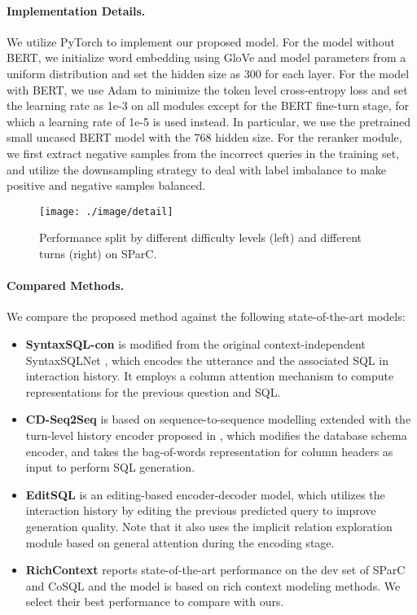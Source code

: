 \documentclass[letterpaper]{article} \usepackage{aaai21}  \usepackage{times}  \usepackage{helvet} \usepackage{courier}  \usepackage[hyphens]{url}  \usepackage{graphicx} \urlstyle{rm} \def\UrlFont{\rm}  \usepackage{natbib}  \usepackage{caption} \frenchspacing  \setlength{\pdfpagewidth}{8.5in}  \setlength{\pdfpageheight}{11in}
\begin{document}
\paragraph{Implementation Details.}
We utilize PyTorch \cite{DBLP:conf/nips/PaszkeGMLBCKLGA19} to implement our proposed model.
For the model without BERT, we initialize word embedding using GloVe \cite{Pennington2014GloveGV} and model parameters from a uniform distribution and set the hidden size as 300 for each  layer.
For the model with BERT, we use Adam \cite{DBLP:journals/corr/KingmaB14} to minimize the token level cross-entropy loss and set the learning rate as 1e-3 on all modules except for the BERT fine-turn stage, for which a learning rate of 1e-5 is used instead.
In particular, we use the pretrained small uncased BERT model with the 768 hidden size.
For the reranker module, we first extract negative samples from the incorrect queries in the training set, and utilize the downsampling strategy to deal with label imbalance to make positive and negative samples balanced.

\begin{figure}
	\centering
	\texttt{[image: ./image/detail]}
	\caption{Performance split by different difficulty levels (left) and different turns (right) on SParC.}
	\label{detail}
\end{figure}



\paragraph{Compared Methods.}
We compare the proposed method against the following state-of-the-art models:
\begin{itemize}
    \item \textbf{SyntaxSQL-con} is modified from the original context-independent SyntaxSQLNet \cite{DBLP:conf/emnlp/YuYYZWLR18}, which encodes the utterance and the associated SQL in interaction history. It employs a column attention mechanism to compute representations for the previous question and SQL.
    \item \textbf{CD-Seq2Seq} \cite{DBLP:conf/acl/YuZYTLLELPCJDPS19} is based on sequence-to-sequence modelling extended with the turn-level history encoder proposed in \cite{DBLP:conf/naacl/SuhrIA18}, which modifies the database schema encoder, and takes the bag-of-words representation for column headers as input to perform SQL generation.
    \item \textbf{EditSQL} \cite{DBLP:conf/emnlp/ZhangYESXLSXSR19} is an editing-based encoder-decoder model, which utilizes the interaction history by editing the previous predicted query to improve generation quality. 
    Note that it also uses the implicit relation exploration module based on general attention during the encoding stage.
    \item \textbf{RichContext} \cite{DBLP:conf/ijcai/LiuCGLZZ20} reports state-of-the-art performance on the dev set of SParC and CoSQL and the model is based on rich context modeling methods. We select their best performance to compare with ours. 
\end{itemize}
\end{document}
